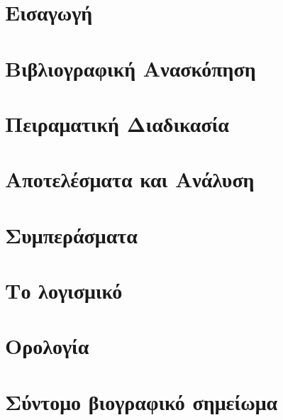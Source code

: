 \documentclass[12pt]{report}
\begin{document}











\tableofcontents



\chapter{Εισαγωγή}


\chapter{Βιβλιογραφική Ανασκόπηση}




\chapter{Πειραματική Διαδικασία}


\chapter{Αποτελέσματα και Ανάλυση}


\chapter{Συμπεράσματα}




\appendix
\chapter{Το λογισμικό}


\chapter{Ορολογία}


\chapter{Σύντομο βιογραφικό σημείωμα}


\printglossaries
\end{document}
